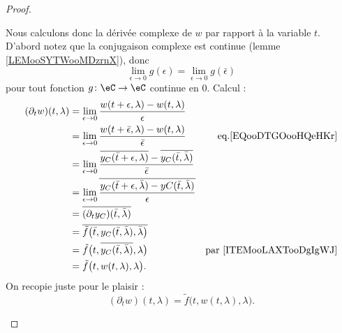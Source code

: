 \begin{proof}
\begin{subproof}
		Nous calculons donc la dérivée complexe de \(w \) par rapport à la variable \( t \). D'abord notez que la conjugaison complexe est continue (lemme \ref{LEMooSYTWooMDzrnX}), donc
		\begin{equation}		\label{EQooDTGOooHQeHKr}
			\lim_{\epsilon\to 0}g(\epsilon)=\lim_{\epsilon\to 0}g(\bar\epsilon)
		\end{equation}
		pour tout fonction \(g \colon \eC\to \eC  \) continue en \( 0\). Calcul  :
		\begin{subequations}
			\begin{align}
				(\partial_tw)(t,\lambda) & =\lim_{\epsilon\to 0}\frac{ w(t+\epsilon,\lambda)-w(t,\lambda) }{ \epsilon }                                                                                     \\
				                         & =\lim_{\epsilon\to 0}\frac{ w(t+\bar\epsilon,\lambda)-w(t,\lambda) }{ \bar\epsilon }                                       & \text{eq.\eqref{EQooDTGOooHQeHKr}}  \\
				                         & =\lim_{\epsilon\to 0}\frac{ \overline{y_C(\bar t+\epsilon,\lambda)}-\overline{y_C(\bar t,\bar \lambda)} }{ \bar \epsilon }                                       \\
				                         & =\lim_{\epsilon\to 0}\overline{   \frac{ y_C(\bar t+\epsilon,\bar \lambda)-yC(\bar t,\bar \lambda) }{ \epsilon }  }                                              \\
				                         & =\overline{(\partial_ty_C)(\bar t,\bar\lambda)}                                                                                                                  \\
				                         & =\overline{  \tilde f\big(\bar t,y_C(\bar t,\bar\lambda),\bar \lambda\big) }                                                                                     \\
				                         & =\tilde f\big( t,\overline{y_C(\bar t,\bar \lambda)},\lambda \big)                                                         & \text{par \ref{ITEMooLAXTooDgIgWJ}} \\
				                         & =\tilde f\big( t,w(t,\lambda),\lambda \big).
			\end{align}
		\end{subequations}
		On recopie juste pour le plaisir :
		\begin{equation}
			(\partial_tw)(t,\lambda) =\tilde f\big( t,w(t,\lambda),\lambda \big).
		\end{equation}

\end{subproof}
\end{proof}
